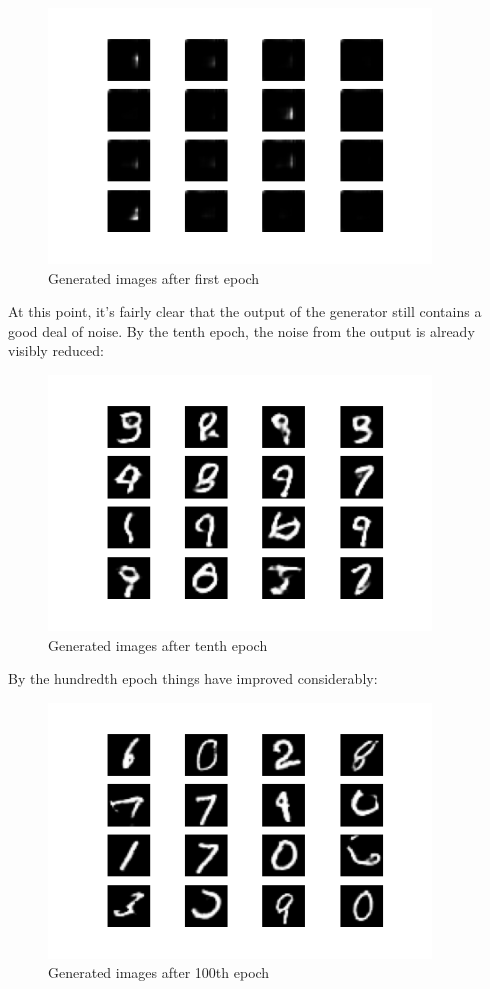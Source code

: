 \documentclass{article}
\begin{document}
\begin{figure}[H]
    \centering
    \includegraphics[width=4in]{csci-8110/hw-4/images/generated_plot_e001.png}
    \caption{Generated images after first epoch}
    \label{fig:ep1}
\end{figure}

\par At this point, it's fairly clear that the output of the generator still contains a good deal of noise.
By the tenth epoch, the noise from the output is already visibly reduced:

\begin{figure}[H]
    \centering
    \includegraphics[width=4in]{csci-8110/hw-4/images/generated_plot_e010.png}
    \caption{Generated images after tenth epoch}
    \label{fig:ep10}
\end{figure}

\par By the hundredth epoch things have improved considerably:

\begin{figure}[H]
    \centering
    \includegraphics[width=4in]{csci-8110/hw-4/images/generated_plot_e100.png}
    \caption{Generated images after 100th epoch}
    \label{fig:ep100}
\end{figure}
\end{document}
